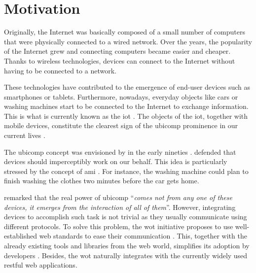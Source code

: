 \section{Motivation}
\label{sec:Motivation}


Originally, the Internet was basically composed of a small number of computers that were physically connected to a wired network.
Over the years, the popularity of the Internet grew and connecting computers became easier and cheaper.
Thanks to wireless technologies, devices can connect to the Internet without having to be connected to a network.

These technologies have contributed to the emergence of end-user devices such as smartphones or tablets.
Furthermore, nowadays, everyday objects like cars or washing machines start to be connected to the Internet to exchange information.
This is what is currently known as the \ac{iot} \citep{atzori_internet_2010}.
The objects of the \ac{iot}, together with mobile devices, constitute the clearest sign of the \acf{ubicomp} prominence in our current lives \citep{caceres_ubicomp_2012}.

The \ac{ubicomp} concept was envisioned by \citeauthor{weiser1991computer} in the early nineties \citep{weiser1991computer}. %
\citeauthor{weiser1991computer} defended that devices should imperceptibly work on our behalf. %
This idea is particularly stressed by the concept of \ac{ami} \citep{ramos_ambient_2008}.
For instance, the washing machine could plan to finish washing the clothes two minutes before the car gets home.


\bigskip


\citeauthor{weiser1991computer} remarked that the real power of \ac{ubicomp} ``\emph{comes not from any one of these devices, it emerges from the interaction of all of them}''.
However, integrating devices to accomplish such task is not trivial as they usually communicate using different protocols.
To solve this problem, the \ac{wot} initiative proposes to use well-established web standards to ease their communication \citep{guinard_thesis_2011}.
This, together with the already existing tools and libraries from the web world, simplifies its adoption by developers \citep{guinard_search_2011}.
Besides, the \ac{wot} naturally integrates with the currently widely used \acs{rest}ful web applications.

